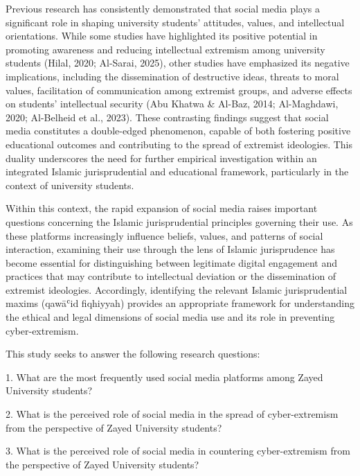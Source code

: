 \documentclass[10pt]{NSP1}
\begin{document}
Previous research has consistently demonstrated that social media plays a significant role in shaping university students' attitudes, values, and intellectual orientations. While some studies have highlighted its positive potential in promoting awareness and reducing intellectual extremism among university students (Hilal, 2020; Al-Sarai, 2025), other studies have emphasized its negative implications, including the dissemination of destructive ideas, threats to moral values, facilitation of communication among extremist groups, and adverse effects on students' intellectual security (Abu Khatwa \& Al-Baz, 2014; Al-Maghdawi, 2020; Al-Belheid et al., 2023). These contrasting findings suggest that social media constitutes a double-edged phenomenon, capable of both fostering positive educational outcomes and contributing to the spread of extremist ideologies. This duality underscores the need for further empirical investigation within an integrated Islamic jurisprudential and educational framework, particularly in the context of university students.

Within this context, the rapid expansion of social media raises important questions concerning the Islamic jurisprudential principles governing their use. As these platforms increasingly influence beliefs, values, and patterns of social interaction, examining their use through the lens of Islamic jurisprudence has become essential for distinguishing between legitimate digital engagement and practices that may contribute to intellectual deviation or the dissemination of extremist ideologies. Accordingly, identifying the relevant Islamic jurisprudential maxims (qawāʿid fiqhiyyah) provides an appropriate framework for understanding the ethical and legal dimensions of social media use and its role in preventing cyber-extremism.

\par\medskip{}\smallskip

This study seeks to answer the following research questions:

1. What are the most frequently used social media platforms among Zayed University students?

2. What is the perceived role of social media in the spread of cyber-extremism from the perspective of Zayed University students?

3. What is the perceived role of social media in countering cyber-extremism from the perspective of Zayed University students?
\end{document}
